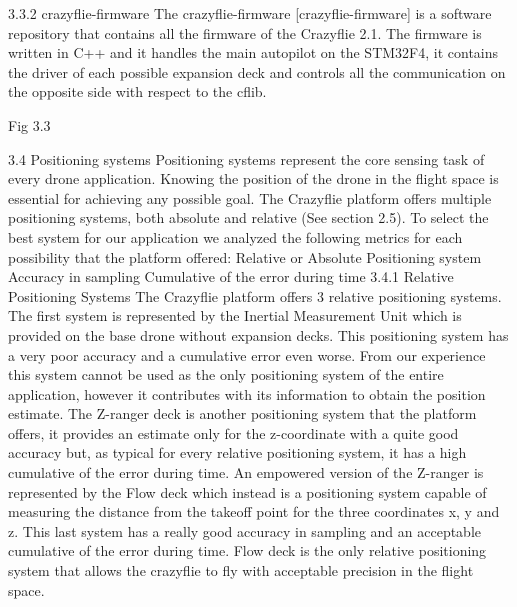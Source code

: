 3.3.2 crazyflie-firmware
The crazyflie-firmware [crazyflie-firmware] is a software repository that contains all the firmware of the Crazyflie 2.1. The firmware is written in C++ and it handles the main autopilot on the STM32F4, it contains the driver of each possible expansion deck and controls all the communication on the opposite side with respect to the cflib.


Fig 3.3













3.4 Positioning systems
Positioning systems represent the core sensing task of every drone application. Knowing the position of the drone in the flight space is essential for achieving any possible goal.
The Crazyflie platform offers multiple positioning systems, both absolute and relative (See section 2.5). To select the best system for our application we analyzed the following metrics for each possibility that the platform offered:
Relative or Absolute Positioning system
Accuracy in sampling
Cumulative of the error during time
3.4.1 Relative Positioning Systems
The Crazyflie platform offers 3 relative positioning systems. The first system is represented by the Inertial Measurement Unit which is provided on the base drone without expansion decks. This positioning system has a very poor accuracy and a cumulative error even worse. From our experience this system cannot be used as the only positioning system of the entire application, however it contributes with its information to obtain the position estimate.
The Z-ranger deck is another positioning system that the platform offers, it provides an estimate only for the z-coordinate with a quite good accuracy but, as typical for every relative positioning system, it has a high cumulative of the error during time. An empowered version of the Z-ranger is represented by the Flow deck which instead is a positioning system capable of measuring the distance from the takeoff point for the three coordinates x, y and z. This last system has a really good accuracy in sampling and an acceptable cumulative of the error during time. Flow deck is the only relative positioning system that allows the crazyflie to fly with acceptable precision in the flight space.

